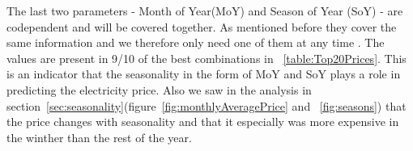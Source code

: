 The last two parameters - Month of Year(MoY) and Season of Year (SoY) - are codependent and will be covered together. As mentioned before they cover the same information and we therefore only need one of them at any time . The values are present in 9/10 of the best combinations in ~\ref{table:Top20Prices}. This is an indicator that the seasonality in the form of MoY and SoY plays a role in predicting the electricity price. Also we saw in the analysis in section~\ref{sec:seasonality}(figure~\ref{fig:monthlyAveragePrice} and ~\ref{fig:seasons}) that the price changes with seasonality and that it especially was more expensive in the winther than the rest of the year.


\begin{table}[H]
\centering  %
\caption{The bottom 10 input combinations for price prediction} %
\label{table:Bottom10Prices} %
\end{table}

